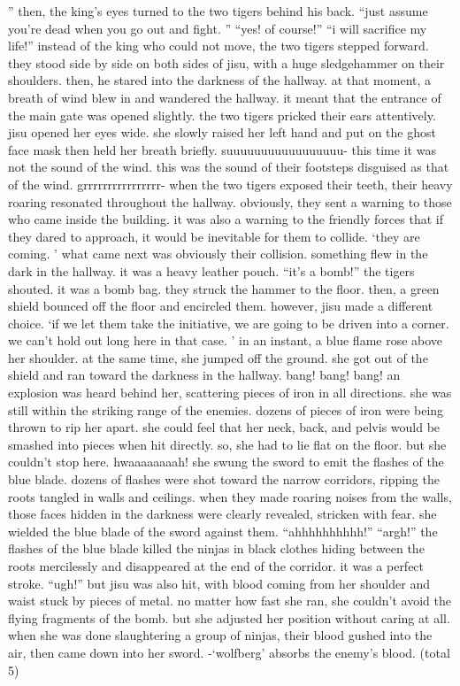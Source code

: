 ” then, the king’s eyes turned to the two tigers behind his back.
 “just assume you’re dead when you go out and fight.
” “yes! of course!” “i will sacrifice my life!” instead of the king who could not move, the two tigers stepped forward.
 they stood side by side on both sides of jisu, with a huge sledgehammer on their shoulders.
 then, he stared into the darkness of the hallway.
 at that moment, a breath of wind blew in and wandered the hallway.
 it meant that the entrance of the main gate was opened slightly.
 the two tigers pricked their ears attentively.
 jisu opened her eyes wide.
 she slowly raised her left hand and put on the ghost face mask then held her breath briefly.
 suuuuuuuuuuuuuuuuu- this time it was not the sound of the wind.
 this was the sound of their footsteps disguised as that of the wind.
 grrrrrrrrrrrrrrrr- when the two tigers exposed their teeth, their heavy roaring resonated throughout the hallway.
 obviously, they sent a warning to those who came inside the building.
 it was also a warning to the friendly forces that if they dared to approach, it would be inevitable for them to collide.
 ‘they are coming.
’ what came next was obviously their collision.
 something flew in the dark in the hallway.
 it was a heavy leather pouch.
 “it’s a bomb!” the tigers shouted.
 it was a bomb bag.
 they struck the hammer to the floor.
 then, a green shield bounced off the floor and encircled them.
 however, jisu made a different choice.
 ‘if we let them take the initiative, we are going to be driven into a corner.
 we can’t hold out long here in that case.
’ in an instant, a blue flame rose above her shoulder.
 at the same time, she jumped off the ground.
 she got out of the shield and ran toward the darkness in the hallway.
 bang! bang! bang! an explosion was heard behind her, scattering pieces of iron in all directions.
 she was still within the striking range of the enemies.
 dozens of pieces of iron were being thrown to rip her apart.
 she could feel that her neck, back, and pelvis would be smashed into pieces when hit directly.
 so, she had to lie flat on the floor.
 but she couldn’t stop here.
 hwaaaaaaaah! she swung the sword to emit the flashes of the blue blade.
 dozens of flashes were shot toward the narrow corridors, ripping the roots tangled in walls and ceilings.
 when they made roaring noises from the walls, those faces hidden in the darkness were clearly revealed, stricken with fear.
 she wielded the blue blade of the sword against them.
 “ahhhhhhhhhh!” “argh!” the flashes of the blue blade killed the ninjas in black clothes hiding between the roots mercilessly and disappeared at the end of the corridor.
 it was a perfect stroke.
 “ugh!” but jisu was also hit, with blood coming from her shoulder and waist stuck by pieces of metal.
 no matter how fast she ran, she couldn’t avoid the flying fragments of the bomb.
 but she adjusted her position without caring at all.
 when she was done slaughtering a group of ninjas, their blood gushed into the air, then came down into her sword.
 -‘wolfberg’ absorbs the enemy’s blood.
 (total 5)

